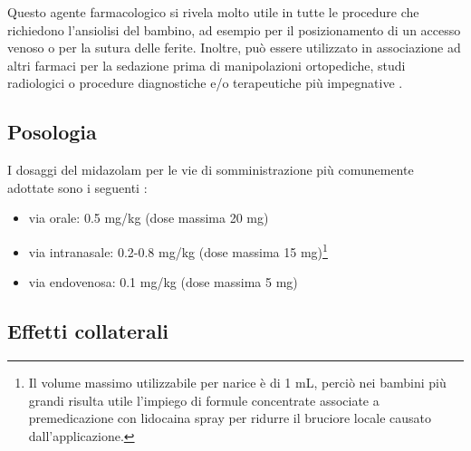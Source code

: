 Questo agente farmacologico si rivela molto utile in tutte le procedure che richiedono l'ansiolisi del bambino, ad esempio per il posizionamento di un accesso venoso o per la sutura delle ferite. Inoltre, può essere utilizzato in associazione ad altri farmaci per la sedazione prima di manipolazioni ortopediche, studi radiologici o procedure diagnostiche e/o terapeutiche più impegnative \cite{Simeupsedazione, Olkkola2008}. 

\subsection*{Posologia}

I dosaggi del midazolam per le vie di somministrazione più comunemente adottate sono i seguenti \cite{Simeupsedazione}: 
\begin{itemize}
    \item via orale: 0.5 mg/kg (dose massima 20 mg)
    \item via intranasale: 0.2-0.8 mg/kg (dose massima 15 mg)\footnote{Il volume massimo utilizzabile per narice è di 1 mL, perciò nei bambini più grandi risulta utile l'impiego di formule concentrate associate a premedicazione con lidocaina spray per ridurre il bruciore locale causato dall'applicazione.}
    \item via endovenosa: 0.1 mg/kg (dose massima 5 mg)
\end{itemize}

\subsection*{Effetti collaterali}

